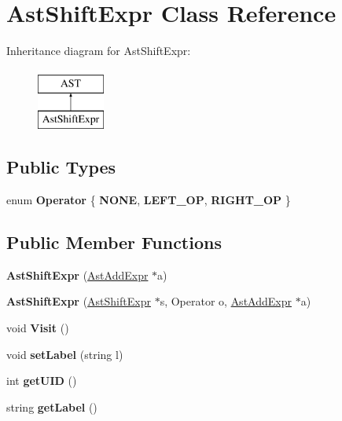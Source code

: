 \hypertarget{classAstShiftExpr}{\section{Ast\-Shift\-Expr Class Reference}
\label{classAstShiftExpr}
}
Inheritance diagram for Ast\-Shift\-Expr\-:\begin{figure}[H]
\begin{center}
\leavevmode
\includegraphics[height=2.000000cm]{classAstShiftExpr}
\end{center}
\end{figure}
\subsection*{Public Types}
\begin{DoxyCompactItemize}
\item 
enum {\bfseries Operator} \{ {\bfseries N\-O\-N\-E}, 
{\bfseries L\-E\-F\-T\-\_\-\-O\-P}, 
{\bfseries R\-I\-G\-H\-T\-\_\-\-O\-P}
 \}
\end{DoxyCompactItemize}
\subsection*{Public Member Functions}
\begin{DoxyCompactItemize}
\item 
\hypertarget{classAstShiftExpr_ae85c464914cce70d3ebb4f51b898781f}{{\bfseries Ast\-Shift\-Expr} (\hyperlink{classAstAddExpr}{Ast\-Add\-Expr} $\ast$a)}\label{classAstShiftExpr_ae85c464914cce70d3ebb4f51b898781f}

\item 
\hypertarget{classAstShiftExpr_a9c8c73a11d9e4da6264b1d83d4339cdb}{{\bfseries Ast\-Shift\-Expr} (\hyperlink{classAstShiftExpr}{Ast\-Shift\-Expr} $\ast$s, Operator o, \hyperlink{classAstAddExpr}{Ast\-Add\-Expr} $\ast$a)}\label{classAstShiftExpr_a9c8c73a11d9e4da6264b1d83d4339cdb}

\item 
\hypertarget{classAstShiftExpr_ae20f0c9604ec1ca74911337e3ed375e5}{void {\bfseries Visit} ()}\label{classAstShiftExpr_ae20f0c9604ec1ca74911337e3ed375e5}

\item 
\hypertarget{classAST_a71d680856e95ff89f55d5311a552eba6}{void {\bfseries set\-Label} (string l)}\label{classAST_a71d680856e95ff89f55d5311a552eba6}

\item 
\hypertarget{classAST_ab7a5b1d9f1c2de0d98deb356f724a42c}{int {\bfseries get\-U\-I\-D} ()}\label{classAST_ab7a5b1d9f1c2de0d98deb356f724a42c}

\item 
\hypertarget{classAST_aee029be902fffc927d16ccb03eb922ad}{string {\bfseries get\-Label} ()}\label{classAST_aee029be902fffc927d16ccb03eb922ad}

\end{DoxyCompactItemize}
